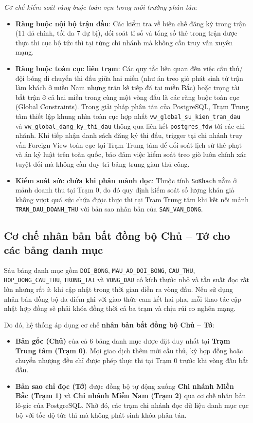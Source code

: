 \textit{Cơ chế kiểm soát ràng buộc toàn vẹn trong môi trường phân tán}:
\begin{itemize}
    \item \textbf{Ràng buộc nội bộ trận đấu}: Các kiểm tra về biên chế đăng ký trong trận (11 đá chính, tối đa 7 dự bị), đối soát tỉ số và tổng số thẻ trong trận được thực thi cục bộ tức thì tại từng chi nhánh mà không cần truy vấn xuyên mạng.
    \item \textbf{Ràng buộc toàn cục liên trạm}: Các quy tắc liên quan đến việc cầu thủ/đội bóng di chuyển thi đấu giữa hai miền (như án treo giò phát sinh từ trận làm khách ở miền Nam nhưng trận kế tiếp đá tại miền Bắc) hoặc trọng tài bắt trận ở cả hai miền trong cùng một vòng đấu là các ràng buộc toàn cục (Global Constraints). Trong giải pháp phân tán của PostgreSQL, Trạm Trung tâm thiết lập khung nhìn toàn cục hợp nhất \texttt{vw\_global\_su\_kien\_tran\_dau} và \texttt{vw\_global\_dang\_ky\_thi\_dau} thông qua liên kết \texttt{postgres\_fdw} tới các chi nhánh. Khi tiếp nhận danh sách đăng ký thi đấu, trigger tại chi nhánh truy vấn Foreign View toàn cục tại Trạm Trung tâm để đối soát lịch sử thẻ phạt và án kỷ luật trên toàn quốc, bảo đảm việc kiểm soát treo giò luôn chính xác tuyệt đối mà không cần duy trì bảng trung gian thủ công.
    \item \textbf{Kiểm soát sức chứa khi phân mảnh dọc}: Thuộc tính \texttt{SoKhach} nằm ở mảnh doanh thu tại Trạm 0, do đó quy định kiểm soát số lượng khán giả không vượt quá sức chứa được thực thi tại Trạm Trung tâm khi kết nối mảnh \texttt{TRAN\_DAU\_DOANH\_THU} với bản sao nhân bản của \texttt{SAN\_VAN\_DONG}.
\end{itemize}

\subsection{Cơ chế nhân bản bất đồng bộ Chủ -- Tớ cho các bảng danh mục}
Sáu bảng danh mục gồm \texttt{DOI\_BONG}, \texttt{MAU\_AO\_DOI\_BONG}, \texttt{CAU\_THU}, \texttt{HOP\_DONG\_CAU\_THU}, \texttt{TRONG\_TAI} và \texttt{VONG\_DAU} có kích thước nhỏ và tần suất đọc rất lớn nhưng rất ít khi cập nhật trong thời gian diễn ra vòng đấu. Nếu sử dụng nhân bản đồng bộ đa điểm ghi với giao thức cam kết hai pha, mỗi thao tác cập nhật hợp đồng sẽ phải khóa đồng thời cả ba trạm và chịu rủi ro nghẽn mạng.

Do đó, hệ thống áp dụng cơ chế \textbf{nhân bản bất đồng bộ Chủ -- Tớ}:
\begin{itemize}
    \item \textbf{Bản gốc (Chủ)} của cả 6 bảng danh mục được đặt duy nhất tại \textbf{Trạm Trung tâm (Trạm 0)}. Mọi giao dịch thêm mới cầu thủ, ký hợp đồng hoặc chuyển nhượng đều chỉ được phép thực thi tại Trạm 0 trước khi vòng đấu bắt đầu.
    \item \textbf{Bản sao chỉ đọc (Tớ)} được đồng bộ tự động xuống \textbf{Chi nhánh Miền Bắc (Trạm 1)} và \textbf{Chi nhánh Miền Nam (Trạm 2)} qua cơ chế nhân bản lô-gic của PostgreSQL. Nhờ đó, các trạm chi nhánh đọc dữ liệu danh mục cục bộ với tốc độ tức thì mà không phát sinh khóa phân tán.
\end{itemize}

